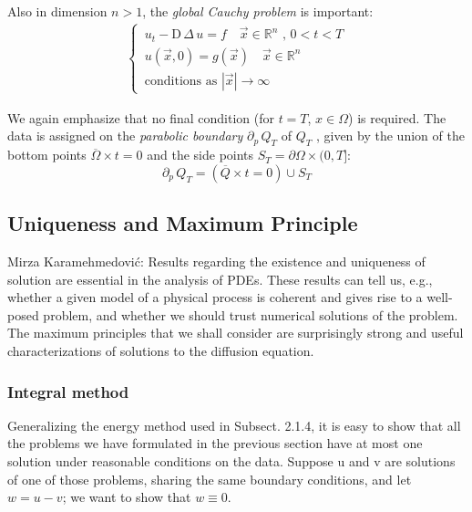 \documentclass[../main.tex]{subfiles}
\begin{document}
Also in dimension $n > 1$, the \textit{global Cauchy problem} is important:
\begin{align}
    \begin{cases}
        \, u_t - \mathrm{D} \, \Delta \, u = f \quad \vec{x} \in \mathbb{R}^n \text{ ,  } 0 < t < T \\
        \, u(\vec{x},0) = g(\vec{x}) \quad \vec{x} \in \mathbb{R}^n \\
        \, \text{conditions as } |\vec{x}| \rightarrow \infty
    \end{cases}
\end{align}

We again emphasize that no final condition (for $t = T$, $x \in \Omega$) is required. The data is assigned on the \textit{parabolic boundary} $\partial_p \, Q_T$ of $Q_T$ , given by the union of the bottom points $\overline{\Omega} 
\times {t=0}$ and the side points $S_T = \partial \Omega \times (0,T]$:
\begin{equation}
    \partial_p \, Q_T = (\overline{Q} \times {t=0}) \cup S_T
\end{equation}

\subsection{Uniqueness and Maximum Principle}

\begin{quotebar}
    Mirza Karamehmedović: Results regarding the existence and uniqueness of solution are essential in the analysis of PDEs. These results can tell us, e.g., whether a given model of a physical process is coherent and gives rise to a well-posed problem, and whether we should trust numerical solutions of the problem. The maximum principles that we shall consider are surprisingly strong and useful characterizations of solutions to the diffusion equation.
\end{quotebar}

\subsubsection{Integral method}

Generalizing the energy method used in Subsect. 2.1.4, it is easy to show that all the problems we have formulated in the previous section have at most one solution under reasonable conditions on the data. Suppose u and v are solutions of one of those problems, sharing the same boundary conditions, and let $w = u − v$; we want to show that $w \equiv 0$.
\end{document}
